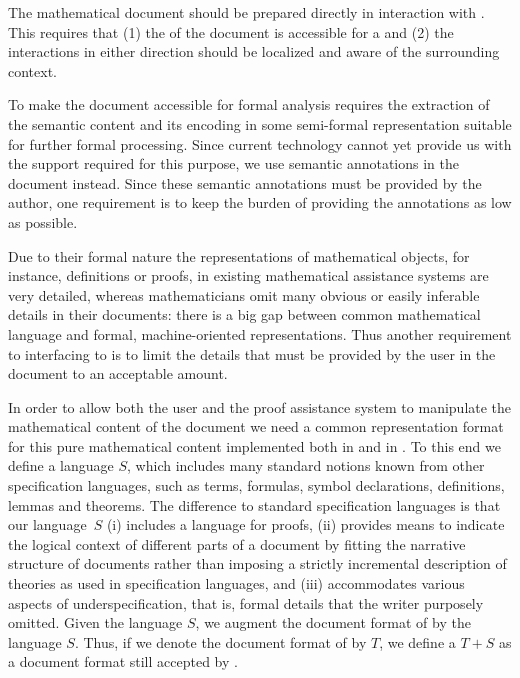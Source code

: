 \begin{omgroup}[id=texmacs-omega,short=Proof Assistants in Scientific Editors,
  creators={autexier,benzmueller,fiedler,lesourd}]
The mathematical document should be prepared directly in interaction with {\OMEGA}. This
requires that (1) the {} of the document is accessible for a
{} and (2) the interactions in either direction should be
localized and aware of the surrounding context.

To make the document accessible for formal analysis requires the extraction of the
semantic content and its encoding in some semi-formal representation suitable for further
formal processing.  Since current {} technology cannot
yet provide us with the support required for this purpose, we use semantic annotations in
the {\texmacs} document instead. Since these semantic annotations must be provided by the
author, one requirement is to keep the burden of providing the annotations as low as
possible.

Due to their formal nature the representations of mathematical objects, for instance,
definitions or proofs, in existing mathematical assistance systems are very detailed,
whereas mathematicians omit many obvious or easily inferable details in their documents:
there is a big gap between common mathematical language and formal, machine-oriented
representations.  Thus another requirement to interfacing {\texmacs} to {\OMEGA} is to
limit the details that must be provided by the user in the {\texmacs} document to an
acceptable amount.


In order to allow both the user and the proof assistance system to manipulate the
mathematical content of the document we need a common representation format for this pure
mathematical content implemented both in {\texmacs} and in {\OMEGA}. To this end we define
a language $S$, which includes many standard notions known from other specification
languages, such as terms, formulas, symbol declarations, definitions, lemmas and theorems.
The difference to standard specification languages is that our language~$S$ (i) includes a
language for proofs, (ii) provides means to indicate the logical context of different
parts of a document by fitting the narrative structure of documents rather than imposing a
strictly incremental description of theories as used in specification languages, and (iii)
accommodates various aspects of underspecification, that is, formal details that the
writer purposely omitted.  Given the language $S$, we augment the document format of
{\texmacs} by the language $S$.  Thus, if we denote the document format of {\texmacs} by
$T$, we define a {} $T+S$ as a document format still
accepted by {\texmacs}.


\end{omgroup}
